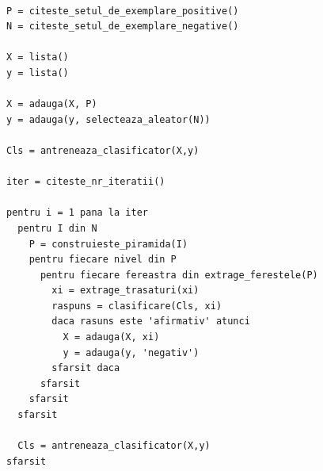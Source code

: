 \begin{mdframed}
\begin{verbatim}

P = citeste_setul_de_exemplare_positive()
N = citeste_setul_de_exemplare_negative()

X = lista()
y = lista()

X = adauga(X, P)
y = adauga(y, selecteaza_aleator(N))

Cls = antreneaza_clasificator(X,y)

iter = citeste_nr_iteratii()

pentru i = 1 pana la iter
  pentru I din N
    P = construieste_piramida(I)
    pentru fiecare nivel din P
      pentru fiecare fereastra din extrage_ferestele(P)
        xi = extrage_trasaturi(xi)
        raspuns = clasificare(Cls, xi)
        daca rasuns este 'afirmativ' atunci
          X = adauga(X, xi)
          y = adauga(y, 'negativ')
        sfarsit daca
      sfarsit
    sfarsit
  sfarsit
  
  Cls = antreneaza_clasificator(X,y)
sfarsit
\end{verbatim}
\end{mdframed}



















